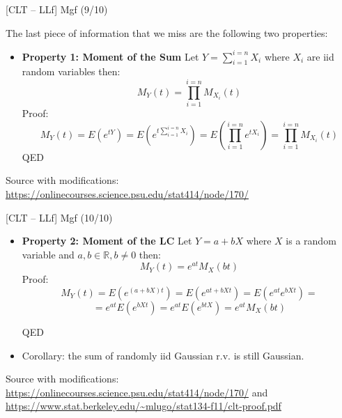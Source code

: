 \documentclass{beamer}
\begin{document}
\begin{frame}
{\centerline{[CLT -- LLf] Mgf (9/10)}}\label{S:MomentOfSum}
The last piece of information that we miss are the following two properties:
\begin{itemize}
\item  \textbf{Property 1: Moment of the Sum} Let $Y = \sum_{i=1}^{i=n} X_i$ where  $X_i$ are iid random variables then:
$$M_Y(t) = \prod_{i=1}^{i=n} M_{X_i}(t)$$
Proof:
$$M_Y(t) = E(e^{tY}) = E(e^{t\sum_{i=1}^{i=n} X_i}) = E(\prod_{i=1}^{i=n}e^{tX_i})=\prod_{i=1}^{i=n} M_{X_i}(t)$$
QED
\end{itemize}

\begin{center}
\tiny
Source with modifications: \url{https://onlinecourses.science.psu.edu/stat414/node/170/}
\end{center}
\end{frame}


\begin{frame}
{\centerline{[CLT -- LLf] Mgf (10/10)}}\label{S:MomentOfLC}
\begin{itemize}
\item \textbf{Property 2: Moment of the LC} Let $Y = a + bX$ where  $X$ is a random variable and $a, b \in \mathbb{R}, b \neq 0$ then:
$$M_Y(t) =  e^{at}M_{X}(bt)$$
Proof:
$$M_Y(t) =  E(e^{(a + bX)t}) = E(e^{at + bXt})= E(e^{at}e^{bXt}) = $$
$$= e^{at}E(e^{bXt}) = e^{at}E(e^{btX}) = e^{at}M_{X}(bt) $$

QED
\item Corollary: the sum of randomly iid Gaussian r.v. is still Gaussian.
\end{itemize}

\begin{center}
\tiny 
Source with modifications: \url{https://onlinecourses.science.psu.edu/stat414/node/170/} and \url{https://www.stat.berkeley.edu/~mlugo/stat134-f11/clt-proof.pdf}
\end{center}
\end{frame}
\end{document}
